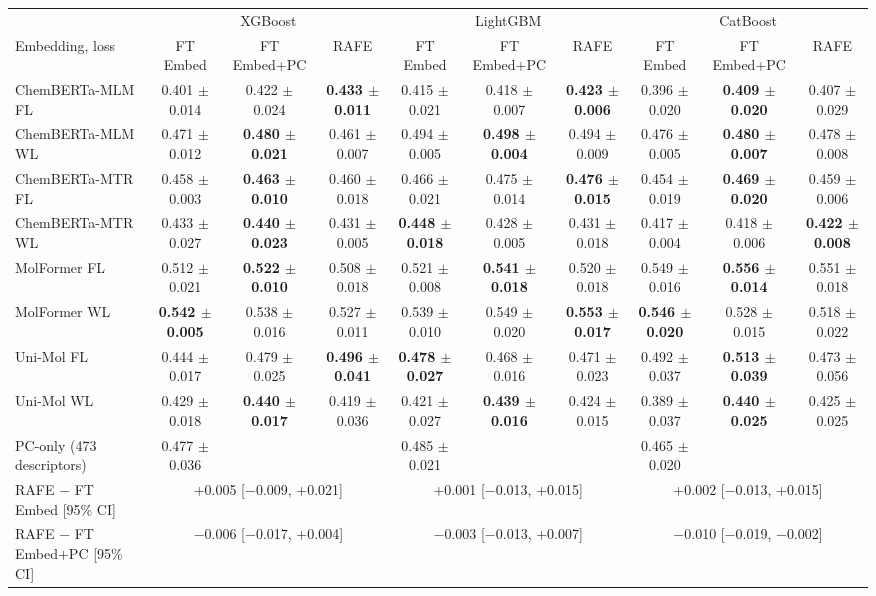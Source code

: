 \begin{tabular}{@{}lccccccccc@{}}
\toprule
 & \multicolumn{3}{c}{XGBoost} & \multicolumn{3}{c}{LightGBM} & \multicolumn{3}{c}{CatBoost} \\
\cmidrule(lr){2-4} \cmidrule(lr){5-7} \cmidrule(lr){8-10}
Embedding, loss & FT Embed & FT Embed+PC & RAFE & FT Embed & FT Embed+PC & RAFE & FT Embed & FT Embed+PC & RAFE \\
\midrule
ChemBERTa-MLM FL & 0.401 $\pm$ 0.014 & 0.422 $\pm$ 0.024 & \textbf{0.433 $\pm$ 0.011} & 0.415 $\pm$ 0.021 & 0.418 $\pm$ 0.007 & \textbf{0.423 $\pm$ 0.006} & 0.396 $\pm$ 0.020 & \textbf{0.409 $\pm$ 0.020} & 0.407 $\pm$ 0.029 \\
ChemBERTa-MLM WL & 0.471 $\pm$ 0.012 & \textbf{0.480 $\pm$ 0.021} & 0.461 $\pm$ 0.007 & 0.494 $\pm$ 0.005 & \textbf{0.498 $\pm$ 0.004} & 0.494 $\pm$ 0.009 & 0.476 $\pm$ 0.005 & \textbf{0.480 $\pm$ 0.007} & 0.478 $\pm$ 0.008 \\
ChemBERTa-MTR FL & 0.458 $\pm$ 0.003 & \textbf{0.463 $\pm$ 0.010} & 0.460 $\pm$ 0.018 & 0.466 $\pm$ 0.021 & 0.475 $\pm$ 0.014 & \textbf{0.476 $\pm$ 0.015} & 0.454 $\pm$ 0.019 & \textbf{0.469 $\pm$ 0.020} & 0.459 $\pm$ 0.006 \\
ChemBERTa-MTR WL & 0.433 $\pm$ 0.027 & \textbf{0.440 $\pm$ 0.023} & 0.431 $\pm$ 0.005 & \textbf{0.448 $\pm$ 0.018} & 0.428 $\pm$ 0.005 & 0.431 $\pm$ 0.018 & 0.417 $\pm$ 0.004 & 0.418 $\pm$ 0.006 & \textbf{0.422 $\pm$ 0.008} \\
MolFormer FL & 0.512 $\pm$ 0.021 & \textbf{0.522 $\pm$ 0.010} & 0.508 $\pm$ 0.018 & 0.521 $\pm$ 0.008 & \textbf{0.541 $\pm$ 0.018} & 0.520 $\pm$ 0.018 & 0.549 $\pm$ 0.016 & \textbf{0.556 $\pm$ 0.014} & 0.551 $\pm$ 0.018 \\
MolFormer WL & \textbf{0.542 $\pm$ 0.005} & 0.538 $\pm$ 0.016 & 0.527 $\pm$ 0.011 & 0.539 $\pm$ 0.010 & 0.549 $\pm$ 0.020 & \textbf{0.553 $\pm$ 0.017} & \textbf{0.546 $\pm$ 0.020} & 0.528 $\pm$ 0.015 & 0.518 $\pm$ 0.022 \\
Uni-Mol FL & 0.444 $\pm$ 0.017 & 0.479 $\pm$ 0.025 & \textbf{0.496 $\pm$ 0.041} & \textbf{0.478 $\pm$ 0.027} & 0.468 $\pm$ 0.016 & 0.471 $\pm$ 0.023 & 0.492 $\pm$ 0.037 & \textbf{0.513 $\pm$ 0.039} & 0.473 $\pm$ 0.056 \\
Uni-Mol WL & 0.429 $\pm$ 0.018 & \textbf{0.440 $\pm$ 0.017} & 0.419 $\pm$ 0.036 & 0.421 $\pm$ 0.027 & \textbf{0.439 $\pm$ 0.016} & 0.424 $\pm$ 0.015 & 0.389 $\pm$ 0.037 & \textbf{0.440 $\pm$ 0.025} & 0.425 $\pm$ 0.025 \\
\midrule
PC-only (473 descriptors) & 0.477 $\pm$ 0.036 &  &  & 0.485 $\pm$ 0.021 &  &  & 0.465 $\pm$ 0.020 &  &  \\
RAFE $-$ FT Embed [95\% CI] & \multicolumn{3}{c}{+0.005 [$-$0.009, +0.021]} & \multicolumn{3}{c}{+0.001 [$-$0.013, +0.015]} & \multicolumn{3}{c}{+0.002 [$-$0.013, +0.015]} \\
RAFE $-$ FT Embed+PC [95\% CI] & \multicolumn{3}{c}{$-$0.006 [$-$0.017, +0.004]} & \multicolumn{3}{c}{$-$0.003 [$-$0.013, +0.007]} & \multicolumn{3}{c}{$-$0.010 [$-$0.019, $-$0.002]} \\
\bottomrule
\end{tabular}
